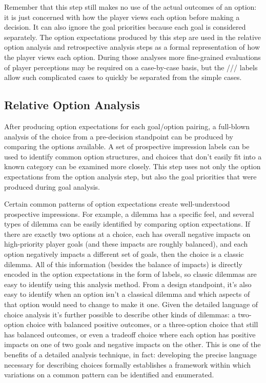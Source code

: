 Remember that this step still makes no use of the actual outcomes of an option: it is just concerned with how the player views each option before making a decision.
%
It can also ignore the goal priorities because each goal is considered separately.
%
The option expectations produced by this step are used in the relative option analysis and retrospective analysis steps as a formal representation of how the player views each option.
%
During those analyses more fine-grained evaluations of player perceptions may be required on a case-by-case basis, but the /// labels allow such complicated cases to quickly be separated from the simple cases.


\subsection{Relative Option Analysis}

\label{sec:cp-relative-option-analysis}

After producing option expectations for each goal/option pairing, a full-blown analysis of the choice from a pre-decision standpoint can be produced by comparing the options available.
%
A set of prospective impression labels can be used to identify common option structures, and choices that don't easily fit into a known category can be examined more closely.
%
This step uses not only the option expectations from the option analysis step, but also the goal priorities that were produced during goal analysis.


Certain common patterns of option expectations create well-understood prospective impressions.
%
For example, a dilemma has a specific feel, and several types of dilemma can be easily identified by comparing option expectations.
%
If there are exactly two options at a choice, each has overall negative impacts on high-priority player goals (and these impacts are roughly balanced), and each option negatively impacts a different set of goals, then the choice is a classic dilemma.
%
All of this information (besides the balance of impacts) is directly encoded in the option expectations in the form of  labels, so classic dilemmas are easy to identify using this analysis method.
%
From a design standpoint, it's also easy to identify when an option isn't a classical dilemma and which aspects of that option would need to change to make it one.
%
Given the detailed language of choice analysis it's further possible to describe other kinds of dilemmas: a two-option choice with balanced positive outcomes, or a three-option choice that still has balanced outcomes, or even a tradeoff choice where each option has positive impacts on one of two goals and negative impacts on the other.
%
This is one of the benefits of a detailed analysis technique, in fact: developing the precise language necessary for describing choices formally establishes a framework within which variations on a common pattern can be identified and enumerated.


